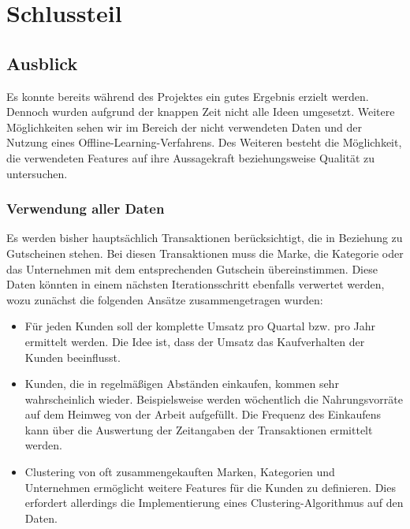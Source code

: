\section{Schlussteil}

\subsection{Ausblick}
Es konnte bereits während des Projektes ein gutes Ergebnis erzielt
werden. Dennoch wurden aufgrund der knappen Zeit nicht alle Ideen
umgesetzt. Weitere Möglichkeiten sehen wir im Bereich der nicht
verwendeten Daten und der Nutzung eines Offline-Learning-Verfahrens.
Des Weiteren besteht die Möglichkeit, die verwendeten Features auf ihre
Aussagekraft beziehungsweise Qualität zu untersuchen.

\subsubsection{Verwendung aller Daten}
Es werden bisher hauptsächlich Transaktionen berücksichtigt, die in Beziehung zu Gutscheinen stehen.
Bei diesen Transaktionen muss die Marke, die Kategorie oder das Unternehmen mit dem entsprechenden Gutschein übereinstimmen.
Diese Daten könnten in einem nächsten Iterationsschritt ebenfalls verwertet werden, wozu zunächst die folgenden Ansätze zusammengetragen wurden:
	
\begin{itemize}
\item Für jeden Kunden soll der komplette Umsatz pro Quartal bzw. pro Jahr ermittelt werden. Die Idee ist, dass der Umsatz das Kaufverhalten der Kunden beeinflusst.
 
\item Kunden, die in regelmäßigen Abständen einkaufen, kommen sehr wahrscheinlich wieder.
Beispielsweise werden wöchentlich die Nahrungsvorräte auf dem Heimweg von der Arbeit aufgefüllt.
Die Frequenz des Einkaufens kann über die Auswertung der Zeitangaben der Transaktionen ermittelt werden.

\item Clustering von oft zusammengekauften Marken, Kategorien und Unternehmen
ermöglicht weitere Features für die Kunden zu definieren.
Dies erfordert allerdings die Implementierung eines Clustering-Algorithmus
auf den Daten.
\end{itemize}

